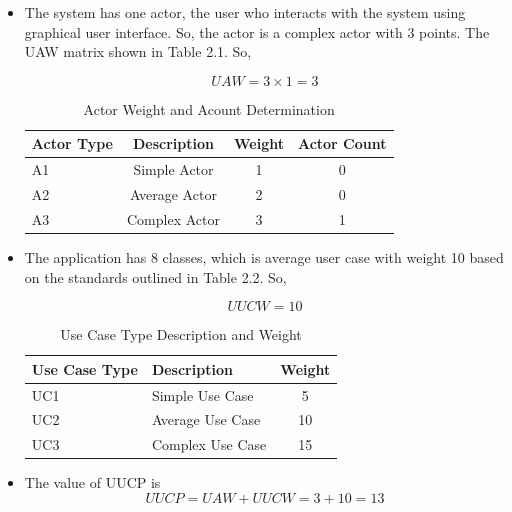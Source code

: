 \documentclass[english,12pt,a4paper]{report}
\begin{document}
		\begin{itemize}[leftmargin=*]
			\item The system has one actor, the user who interacts with the system using graphical user interface. So, the actor is a complex actor with 3 points. The UAW matrix shown in Table 2.1. So,

			\begin{equation}
				UAW = 3 \times 1 = 3
			\end{equation}
			
			\begin{table}[htbp]
				\centering
				\begin{tabular}{@{}lccc@{}}
					\toprule
					Actor Type & Description & Weight & Actor Count \\ 
					\midrule
					A1 & Simple Actor & 1 & 0 \\ 
					A2 & Average Actor & 2 & 0 \\ 
					A3 & Complex Actor & 3 & 1 \\
					\bottomrule
				\end{tabular}
				\caption{Actor Weight and Acount Determination}
				\label{tab:actor_weight}
			\end{table}
						
			\item The application has 8 classes, which is average user case with weight 10 based on the standards outlined in Table 2.2. So,
			
			\begin{equation}
				UUCW = 10
			\end{equation}
			
			\begin{table}[htbp]
				\centering
				\begin{tabular}{@{}llc@{}}
					\toprule
					Use Case Type & Description & Weight \\ 
					\midrule
					UC1 & Simple Use Case & 5 \\
					UC2 & Average Use Case & 10 \\
					UC3 & Complex Use Case & 15 \\
					\bottomrule
				\end{tabular}
				\caption{Use Case Type Description and Weight}
				\label{tab:use_case_weight}
			\end{table}
			
			
			\item The value of UUCP is
			\begin{equation}
				UUCP = UAW + UUCW = 3 + 10 = 13
			\end{equation}
		\end{itemize}
\end{document}
